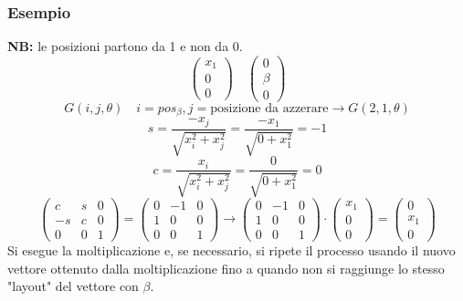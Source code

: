 \documentclass[10pt]{article}
\begin{document}
\subsubsection*{Esempio}
\textbf{NB:} le posizioni partono da 1 e non da 0.
\begin{equation*}
    \begin{pmatrix}
        x_{1} \\ 0 \\ 0
    \end{pmatrix}
    \quad
    \begin{pmatrix}
        0 \\ \beta \\ 0
    \end{pmatrix}
\end{equation*}
\begin{equation*}
    G(i,j,\theta) \quad i=pos_{\beta}, j=\text{posizione da azzerare}\rightarrow G(2,1,\theta)
\end{equation*}
\begin{equation*}
    s = \frac{-x_{j}}{\sqrt{x_{i}^{2}+x_{j}^{2}}} = \frac{-x_{1}}{\sqrt{0+x_{1}^{2}}}= -1
\end{equation*}
\begin{equation*}
    c = \frac{x_{i}}{\sqrt{x_{i}^{2}+x_{j}^{2}}} = \frac{0}{\sqrt{0+x_{1}^{2}}} = 0
\end{equation*}
\begin{equation*}
    \begin{pmatrix}
        c & s & 0 \\
        -s & c & 0 \\
        0 & 0 & 1
    \end{pmatrix} =  \begin{pmatrix}
        0 & -1 & 0 \\
        1 & 0 & 0 \\
        0 & 0 & 1
    \end{pmatrix}\rightarrow \begin{pmatrix}
        0 & -1 & 0 \\
        1 & 0 & 0 \\
        0 & 0 & 1
    \end{pmatrix}\cdot
    \begin{pmatrix}
        x_{1} \\ 0 \\ 0
    \end{pmatrix} = \begin{pmatrix}
        0 \\ x_{1} \\ 0
    \end{pmatrix}
\end{equation*}
Si esegue la moltiplicazione e, se necessario, si ripete il processo usando il nuovo vettore ottenuto dalla moltiplicazione fino a quando non si raggiunge lo stesso "layout" del vettore con $\beta$.
\end{document}
